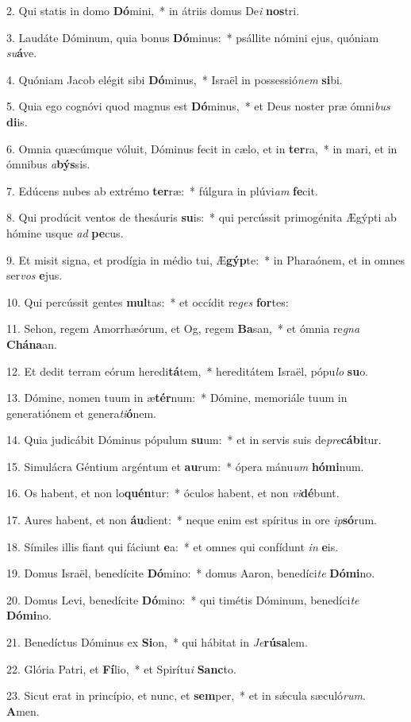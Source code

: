 2. Qui statis in domo \textbf{Dó}mini,~*  in átriis domus De\textit{i} \textbf{nos}tri.\

3. Laudáte Dóminum, quia bonus \textbf{Dó}minus:~*  psállite nómini ejus, quóniam \textit{su}\textbf{á}ve.\

4. Quóniam Jacob elégit sibi \textbf{Dó}minus,~*  Israël in possessió\textit{nem} \textbf{si}bi.\

5. Quia ego cognóvi quod magnus est \textbf{Dó}minus,~*  et Deus noster præ ómni\textit{bus} \textbf{di}is.\

6. Omnia quæcúmque vóluit, Dóminus fecit in cælo, et in \textbf{ter}ra,~*  in mari, et in ómnibus \textit{a}\textbf{býs}sis.\

7. Edúcens nubes ab extrémo \textbf{ter}ræ:~*  fúlgura in plúvi\textit{am} \textbf{fe}cit.\

8. Qui prodúcit ventos de thesáuris \textbf{su}is:~*  qui percússit primogénita Ægýpti ab hómine usque \textit{ad} \textbf{pe}cus.\

9. Et misit signa, et prodígia in médio tui, Æ\textbf{gýp}te:~*  in Pharaónem, et in omnes ser\textit{vos} \textbf{e}jus.\

10. Qui percússit gentes \textbf{mul}tas:~*  et occídit re\textit{ges} \textbf{for}tes:\

11. Sehon, regem Amorrhæórum, et Og, regem \textbf{Ba}san,~*  et ómnia re\textit{gna} \textbf{Chá}\textbf{na}an.\

12. Et dedit terram eórum heredi\textbf{tá}tem,~*  hereditátem Israël, pópu\textit{lo} \textbf{su}o.\

13. Dómine, nomen tuum in æ\textbf{tér}num:~*  Dómine, memoriále tuum in generatiónem et genera\textit{ti}\textbf{ó}nem.\

14. Quia judicábit Dóminus pópulum \textbf{su}um:~*  et in servis suis de\textit{pre}\textbf{cá}\textbf{bi}tur.\

15. Simulácra Géntium argéntum et \textbf{au}rum:~*  ópera mánu\textit{um} \textbf{hó}\textbf{mi}num.\

16. Os habent, et non lo\textbf{quén}tur:~*  óculos habent, et non \textit{vi}\textbf{dé}bunt.\

17. Aures habent, et non \textbf{áu}dient:~*  neque enim est spíritus in ore \textit{ip}\textbf{só}rum.\

18. Símiles illis fiant qui fáciunt \textbf{e}a:~*  et omnes qui confídunt \textit{in} \textbf{e}is.\

19. Domus Israël, benedícite \textbf{Dó}mino:~*  domus Aaron, benedíci\textit{te} \textbf{Dó}\textbf{mi}no.\

20. Domus Levi, benedícite \textbf{Dó}mino:~*  qui timétis Dóminum, benedíci\textit{te} \textbf{Dó}\textbf{mi}no.\

21. Benedíctus Dóminus ex \textbf{Si}on,~*  qui hábitat in \textit{Je}\textbf{rú}\textbf{sa}lem.\

22. Glória Patri, et \textbf{Fí}lio,~*  et Spirítu\textit{i} \textbf{Sanc}to.\

23. Sicut erat in princípio, et nunc, et \textbf{sem}per,~*  et in sǽcula sæculó\textit{rum}. \textbf{A}men.\

